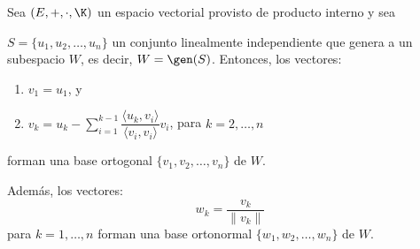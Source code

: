 \documentclass[compacto,10pt]{pubciencias-notas}
\begin{document}
\begin{teo}
Sea $(E,+,\cdot,\K)$ un espacio vectorial provisto de producto interno y sea 

\noindent $S = \{u_1, u_2, \ldots, u_n\}$ un conjunto linealmente independiente que genera a un subespacio $W$, es decir, $W = \gen(S)$. Entonces, los vectores:
\begin{enumerate}
\item 
    $v_1 = u_1$, y
\item
    $\displaystyle v_k = 
        u_k 
        - \sum_{i=1}^{k-1} \dfrac{\langle  u_k, v_i\rangle }{\langle  v_i,v_i\rangle } v_i$, para $k=2,\ldots,n$
\end{enumerate}
forman una base ortogonal $\{v_{1}, v_{2}, \ldots, v_{n}\}$ de $W$.

\noindent Además, los vectores:
\[
    w_{k} = \dfrac{v_{k}}{\|v_{k}\|}
\]
para $k=1,\ldots,n$ forman una base ortonormal $\{w_{1}, w_{2}, \ldots, w_{n}\}$ de $W$.
\end{teo}
\end{document}
